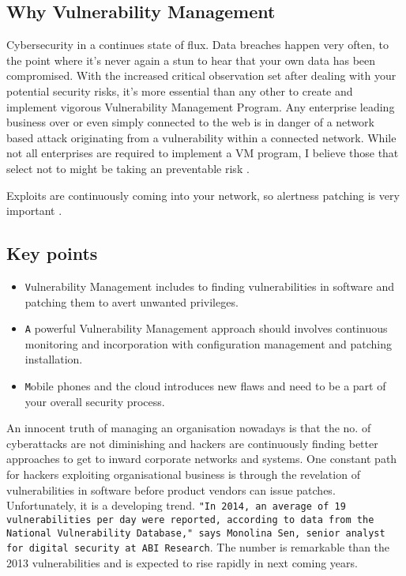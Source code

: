 \subsection{Why Vulnerability Management}

Cybersecurity in a continues state of flux. Data breaches happen very often, to the point where it's never again a stun to hear that your own data has been compromised. With the increased critical observation set after dealing with your potential security risks, it's more essential than any other to create and implement vigorous Vulnerability Management Program. Any enterprise leading business over or even simply connected to the web is in danger of a network based attack originating from a vulnerability within a connected network. While not all enterprises are required to implement a VM program, I believe those that select not to might be taking an preventable risk \cite{whyvm}.  

Exploits are continuously coming into your network, so alertness patching is very important \cite{whyvm1}.

\subsection*{Key points}

\begin{itemize}[label=$\triangleright$]
\item \texttt Vulnerability Management includes to finding vulnerabilities in software and patching them to avert unwanted privileges.
\item \texttt A powerful Vulnerability Management approach should involves continuous monitoring and incorporation with configuration management and patching installation.
\item \texttt Mobile phones and the cloud introduces new flaws and need to be a part of your overall security process.

\end{itemize}

An innocent truth of managing an organisation nowadays is that the no. of cyberattacks are not diminishing and hackers are continuously finding better approaches to get to inward corporate networks and systems. One constant path for hackers exploiting organisational business is through the revelation of vulnerabilities in software before product vendors can issue patches. Unfortunately, it is a developing trend. \texttt{"In 2014, an average of 19 vulnerabilities per day were reported, according to data from the National Vulnerability Database," says Monolina Sen, senior analyst for digital security at ABI Research}. The number is remarkable than the 2013 vulnerabilities and is expected to rise rapidly in next coming years.

